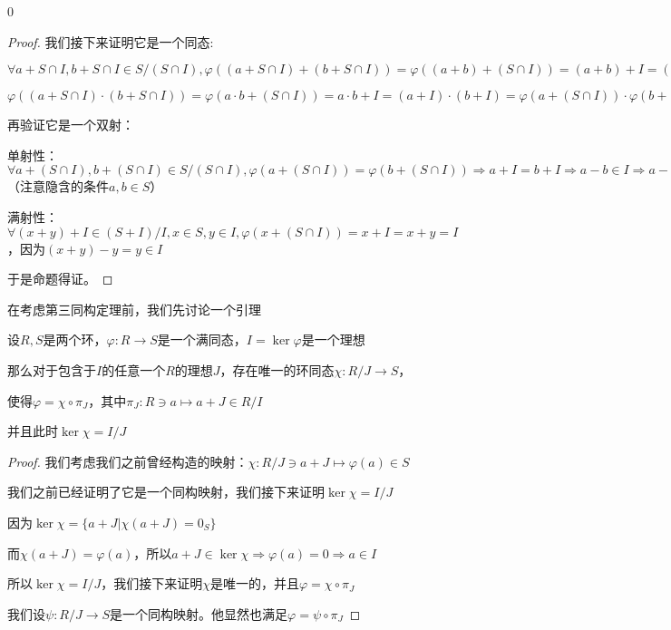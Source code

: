 \documentclass[12pt, a4paper, oneside, UTF8]{ctexbook}
\begin{document}
\begin{para}{0}
\begin{proof}
					我们接下来证明它是一个同态:

					$\forall a+S\cap I,b+S\cap I\in S/(S\cap I),\varphi\left((a+S\cap I)+(b+S\cap I)\right)=\varphi \left((a+b)+(S\cap I)\right)=(a+b)+I=(a+I)+(b+I)=\varphi \left(a+(S\cap I)\right)+\varphi\left(b+(S\cap I)\right)$

					$\varphi\left((a+S\cap I)\cdot (b+S\cap I)\right)=\varphi \left(a\cdot b+(S\cap I)\right)=a\cdot b+I=(a+I)\cdot(b+I)=\varphi \left(a+(S\cap I)\right)\cdot \varphi \left(b+(S\cap I)\right)$
				
					再验证它是一个双射：

					单射性：$\forall a+(S\cap I),b+(S\cap I)\in S/(S\cap I),\varphi \left(a+(S\cap I)\right)=\varphi \left(b+(S\cap I)\right) \Rightarrow a+I=b+I \Rightarrow a-b \in I \Rightarrow a-b \in S\cap I\Rightarrow a+(S\cap I)=b+(S\cap I)$（注意隐含的条件$a,b\in S$）

					满射性：$\forall (x+y)+I \in (S+I)/I,x \in S,y\in I,\varphi \left(x+(S\cap I)\right)=x+I=x+y=I$，因为$(x+y)-y=y \in I$

					于是命题得证。
				\end{proof}
			
				在考虑第三同构定理前，我们先讨论一个引理
				\begin{lemma}{}{}
					设$R,S$是两个环，$\varphi : R \rightarrow S$是一个满同态，$I=\ker \varphi$是一个理想

					那么对于包含于$I$的任意一个$R$的理想$J$，存在唯一的环同态$\chi : R/J \rightarrow S$，
					
					使得$\varphi =\chi \circ \pi_J$，其中$\pi_J : R \ni a \mapsto a+J \in R/I$

					并且此时$\ker \chi =I/J$
				\end{lemma}
				\begin{proof}
					我们考虑我们之前曾经构造的映射：$\chi : R / J \ni a+J \mapsto \varphi (a) \in S$

					我们之前已经证明了它是一个同构映射，我们接下来证明$\ker \chi = I/J$

					因为$\ker \chi =\{a+J | \chi (a+J)=0_S\}$

					而$\chi (a+J)=\varphi (a)$，所以$a+J \in \ker \chi \Rightarrow \varphi (a)=0 \Rightarrow a\in I$

					所以$\ker \chi = I/J$，我们接下来证明$\chi $是唯一的，并且$\varphi =\chi \circ \pi_J$

					我们设$\psi : R/J \rightarrow S$是一个同构映射。他显然也满足$\varphi =\psi \circ \pi_J$


\end{proof}
\end{para}
\end{document}
